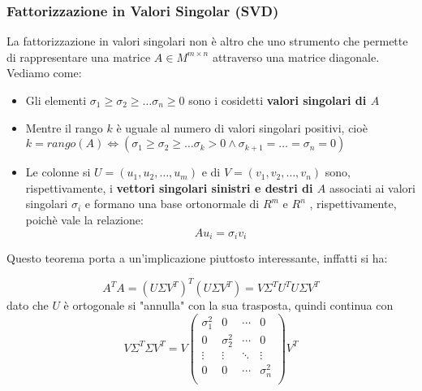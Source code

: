 \subsubsection{Fattorizzazione in Valori Singolar (SVD)}
La fattorizzazione in valori singolari non è altro che uno strumento che permette di rappresentare una matrice $A\in M^{m\times n}$ attraverso una matrice diagonale. Vediamo come:
\begin{itemize}
    \item Gli elementi $\sigma_1\geq\sigma_2\geq\dots\sigma_n\geq 0$ sono i cosidetti  \textbf{valori singolari di $A$}
    \item Mentre il rango $k$ è uguale al numero di valori singolari positivi, cioè $k=rango(A)\iff (\sigma_1\geq\sigma_2\geq\dots\sigma_k > 0\land \sigma_{k+1}=\dots = \sigma_n = 0)$
    \item Le colonne si $U=(u_1,u_2,\dots, u_m)$ e di $V=(v_1,v_2,\dots,v_n)$ sono, rispettivamente, i \textbf{vettori singolari sinistri e destri di $A$} associati ai valori singolari $\sigma_i$ e formano una base ortonormale di $R^m$ e $R^n$ , rispettivamente, poichè vale la relazione:
    \[
            Au_i = \sigma_i v_i
    \]
\end{itemize}


Questo teorema porta a un'implicazione piuttosto interessante, inffatti si ha: 

\[
    A^T A = (U\Sigma V^T)^T (U\Sigma V^T) = V\Sigma^T U^T U\Sigma V^T
\]
dato che $U$ è ortogonale si "annulla" con la sua trasposta, quindi continua con 
\[
    V\Sigma^T \Sigma V^T = V 
    \begin{pmatrix}
        \sigma_1^2 & 0 & \cdots & 0 \\
        0 & \sigma_2^2 & \cdots & 0 \\
        \vdots & \vdots & \ddots & \vdots \\
        0 & 0 & \cdots & \sigma_n^2 \\
    \end{pmatrix} V^T
\]

